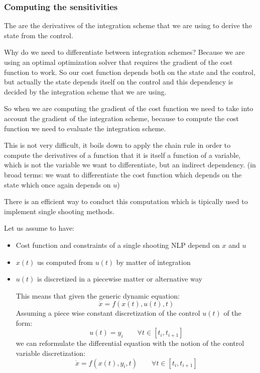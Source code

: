 \subsubsection{Computing the sensitivities}

The  are the derivatives of the integration scheme that we are using to derive the state from the control.

Why do we need to differentiate between integration schemes? Because we are using an optimal optimization solver that requires the gradient of the cost function to work. So our cost function depends both on the state and the control, but actually the state depends itself on the control and this dependency is decided by the integration scheme that we are using.

So when we are computing the gradient of the cost function we need to take into account the gradient of the integration scheme, because to compute the cost function we need to evaluate the integration scheme.

This is not very difficult, it boils down to apply the chain rule in order to compute the derivatives of a function that it is itself a function of a variable, which is not the variable we want to differentiate, but an indirect dependency.
(in broad terms: we want to differentiate the cost function which depends on the state which once again depends on $u$)

There is an efficient way to conduct this computation which is tipically used to implement single shooting methods.\newline

Let us assume to have:
\begin{itemize}
\item Cost function and constraints of a single shooting NLP depend on $x$ and $u$
\item $x(t)$ us computed from $u(t)$ by matter of integration
\item $u(t)$ is discretized in a piecewise matter or alternative way

This means that given the generic dynamic equation:
\[\dot{x} =  f(x(t), u(t), t)\]
Assuming a piece wise constant discretization of the control $u(t)$ of the form:
\[u(t) = y_i\qquad\forall t \in [t_i, t_{i+1}]\]
we can reformulate the differential equation with the notion of the control variable discretization:
\[\dot{x} = f(x(t), y_i, t)\qquad\forall t \in [t_i, t_{i+1}]\]
\end{itemize}

